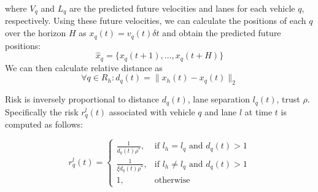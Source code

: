 \documentclass[letterpaper, 10 pt, conference]{ieeeconf}  %
\newcommand\NB[1]{$\spadesuit$\footnote{NB: #1}}
\newcommand\RP[1]{$\clubsuit$\footnote{RP: #1}}
\begin{document}

where $V_q$ and $L_q$ are the predicted future velocities and lanes for each vehicle $q$, respectively.
Using these future velocities, we can calculate the positions of each $q$ over the horizon $H$ as $x_q(t) = v_q(t)\delta t$ and obtain the predicted future positions:
\begin{equation}
    \hat{x}_q = \{x_q(t+1),\ldots,x_q(t+H)\}
\end{equation}
We can then calculate relative distance as
\begin{equation}
    \forall q \in R_h: d_q(t) = \lVert x_h(t)-x_q(t)\rVert_2
\end{equation}




Risk is inversely proportional to distance $d_q(t)$, lane separation $l_q(t)$, trust $\rho$. Specifically the risk $r_q^l(t)$ associated with vehicle $q$ and lane $l$ at time $t$ is computed as follows: %

\begin{equation} \label{eq:riskcalc}
    r_{q}^{l}(t) =
    \begin{cases}
    \frac{1}{d_{q}(t)\rho^*},  & \text{if } l_h=l_q \text{ and } d_{q}(t) > 1  \\
    \frac{1}{\xi d_{q}(t)\rho^*},  & \text{if } l_h\neq l_q \text{ and } d_{q}(t) > 1  \\
        1,                     & \text{otherwise}  
    \end{cases}
\end{equation}
\end{document}
